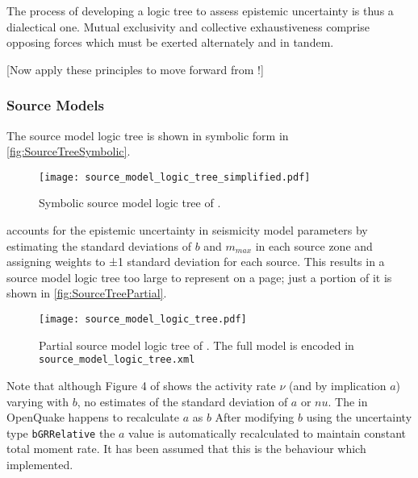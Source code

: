 \documentclass{article}
\begin{document}
The process of developing a logic tree to assess epistemic uncertainty is thus a dialectical one. Mutual exclusivity and collective exhaustiveness comprise opposing forces which must be exerted alternately and in tandem.

[Now apply these principles to move forward from \cite{nath2012probabilistic}!] 

\subsubsection{Source Models}
\label{subsubsec:SourceTree}

The source model logic tree is shown in symbolic form in \autoref{fig:SourceTreeSymbolic}.

\begin{figure}[!htb]
\begin{adjustbox}{center}
\texttt{[image: source\_model\_logic\_tree\_simplified.pdf]}
\end{adjustbox}
\caption[Symbolic source model logic tree]{Symbolic source model logic tree of \cite{nath2012probabilistic}.}
\label{fig:SourceTreeSymbolic}
\end{figure}

\cite{nath2012probabilistic} accounts for the epistemic uncertainty in seismicity model parameters by estimating the standard deviations of $b$ and $m_{max}$ in each source zone and assigning weights to ±1 standard deviation for each source. This results in a source model logic tree too large to represent on a page; just a portion of it is shown in \autoref{fig:SourceTreePartial}. 

\begin{figure}
\begin{adjustbox}{center}
\texttt{[image: source\_model\_logic\_tree.pdf]}
\end{adjustbox}
\caption[Partial source model logic tree]{Partial source model logic tree of \cite{nath2012probabilistic}. The full model is encoded in \texttt{source\_model\_logic\_tree.xml}}
\label{fig:SourceTreePartial}
\end{figure}

Note that although Figure 4 of \cite{nath2012probabilistic} shows the activity rate $\nu$ (and by implication $a$) varying with $b$, no estimates of the standard deviation of $a$ or $nu$. The  in OpenQuake happens to recalculate $a$ as $b$ After modifying $b$ using the uncertainty type \texttt{bGRRelative} the $a$ value is automatically recalculated to maintain constant total moment rate. It has been assumed that this is the behaviour which \cite{nath2012probabilistic} implemented.
\end{document}
